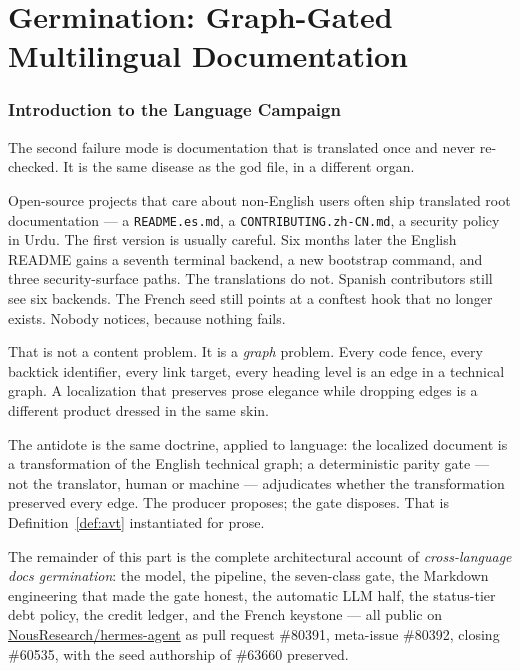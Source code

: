 \documentclass[11pt]{article}
\theoremstyle{definition}
\theoremstyle{plain}
\theoremstyle{remark}
\begin{document}
\part{Germination: Graph-Gated Multilingual Documentation}
\label{part:germ}

\section{Introduction to the Language Campaign}
\label{sec:germ-intro}

The second failure mode is documentation that is translated once and never
re-checked. It is the same disease as the god file, in a different organ.

Open-source projects that care about non-English users often ship translated
root documentation --- a \texttt{README.es.md}, a \texttt{CONTRIBUTING.zh-CN.md},
a security policy in Urdu. The first version is usually careful. Six months
later the English README gains a seventh terminal backend, a new bootstrap
command, and three security-surface paths. The translations do not. Spanish
contributors still see six backends. The French seed still points at a
conftest hook that no longer exists. Nobody notices, because nothing fails.

That is not a content problem. It is a \emph{graph} problem. Every code
fence, every backtick identifier, every link target, every heading level is
an edge in a technical graph. A localization that preserves prose elegance
while dropping edges is a different product dressed in the same skin.

The antidote is the same doctrine, applied to language: the localized
document is a transformation of the English technical graph; a deterministic
parity gate --- not the translator, human or machine --- adjudicates whether
the transformation preserved every edge. The producer proposes; the gate
disposes. That is Definition~\ref{def:avt} instantiated for prose.

The remainder of this part is the complete architectural account of
\emph{cross-language docs germination}: the model, the pipeline, the
seven-class gate, the Markdown engineering that made the gate honest, the
automatic LLM half, the status-tier debt policy, the credit ledger, and the
French keystone --- all public on
\href{https://github.com/NousResearch/hermes-agent}{NousResearch/hermes-agent}
as pull request \#80391, meta-issue \#80392, closing \#60535, with the seed
authorship of \#63660 preserved.
\end{document}
